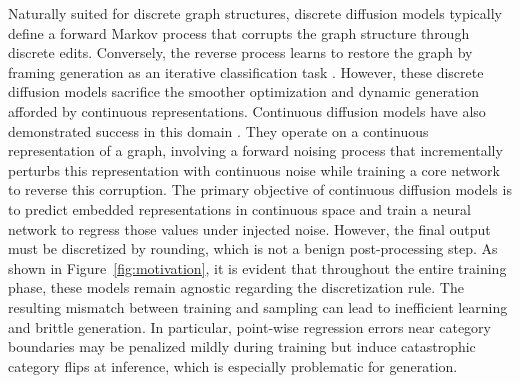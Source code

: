 \documentclass[journal,twoside,web]{ieeecolor}
\begin{document}
Naturally suited for discrete graph structures, discrete diffusion models typically define a forward Markov process that corrupts the graph structure through discrete edits. Conversely, the reverse process learns to restore the graph by framing generation as an iterative classification task \cite{vignac2023digress,xu2024discrete}. 
However, these discrete diffusion models sacrifice the smoother optimization and dynamic generation afforded by continuous representations. Continuous diffusion models have also demonstrated success in this domain \cite{jo2022score,luo2023fast}. They operate on a continuous representation of a graph, involving a forward noising process that incrementally perturbs this representation with continuous noise while training a core network to reverse this corruption.
The primary objective of continuous diffusion models is to predict embedded representations in continuous space and train a neural network to regress those values under injected noise. However, the final output must be discretized by rounding, which is not a benign post-processing step. As shown in Figure~\ref{fig:motivation}, it is evident that throughout the entire training phase, these models remain agnostic regarding the discretization rule. The resulting mismatch between training and sampling can lead to inefficient learning and brittle generation. In particular, point-wise regression errors near category boundaries may be penalized mildly during training but induce catastrophic category flips at inference, which is especially problematic for generation.
\end{document}
